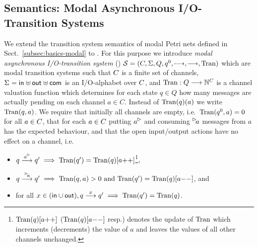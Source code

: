 
\subsection{Semantics: Modal Asynchronous I/O-Transition Systems}
\label{sec:semantics-tgc}

We extend the transition system semantics of modal Petri nets defined in Sect.~\ref{subsec:basics-modal} to \MAIOPNs.
For this purpose we introduce \emph{modal asynchronous I/O-transition system} (\MAIOTS) $\S = (\chan, \Sigma,Q,q^0,\may{},\must{},\val)$
which are modal transition systems such that $C$ is a finite set of channels, $\Sigma_{} = \mathsf{in}_{} \uplus \mathsf{out}_{} \uplus \mathsf{com}_{}$ is an I/O-alphabet over $C$,
and $\mathrm{Tran}: Q  \stackrel{}{\longrightarrow} \mathbb{N}^{C}$  is a channel valuation function which determines for each state $q \in Q$ how many messages are actually pending
on each channel $a \in C$. Instead of $\mathrm{Tran}(q)(a)$ we write $\mathrm{Tran}(q,a)$. We require that initially all channels are empty, i.e.\ $\mathrm{Tran}(q^0,a) = 0$ for all $a \in C$, that for each $a \in C$  putting $\outact{a}$ and consuming $\inact{a}$ messages from $a$ has the expected behaviour, and that the open input/output actions have no effect on a channel, i.e.\
\begin{itemize}
            \item[~] $q \goes{\outact{a}} q' \implies \val(q') = \val(q)[a\mathrm{++}]$\footnote{$\mathrm{Tran}(q)[a\mathrm{++}]$ ($\mathrm{Tran}(q)[a\mathrm{--}]$ resp.) denotes the update of $\mathrm{Tran}$ which increments (decrements)
the value of $a$ and leaves the values of all other channels unchanged.},
            \item[~] $q \goes{\inact{a}} q' \implies \val(q,a) > 0 
            \text{ and } \val(q') = \val(q)[a\mathrm{--}]$, and
            \item[~] for all $x \in (\mathsf{in} \cup \mathsf{out}), q \stackrel{x}{\longrightarrow} q' \implies \mathrm{Tran}(q') = \mathrm{Tran}(q)$.
\end{itemize}



